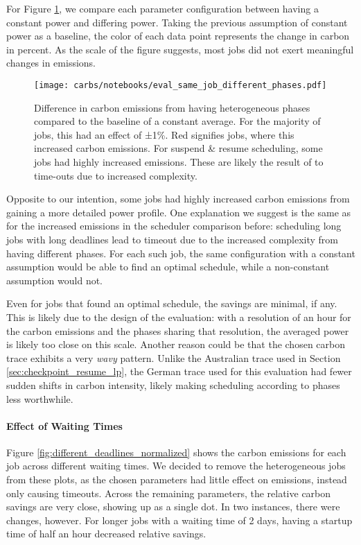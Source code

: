 \newpage
For Figure \ref{fig:different_phases_no_effect_lol}, we compare each parameter configuration between having a constant power and differing power. Taking the previous assumption of constant power as a baseline, the color of each data point represents the change in carbon in percent. As the scale of the figure suggests, most jobs did not exert meaningful changes in emissions. 

\begin{figure}[H]
    \texttt{[image: carbs/notebooks/eval\_same\_job\_different\_phases.pdf]}
    \caption[short]{Difference in carbon emissions from having heterogeneous phases compared to the baseline of a constant average. For the majority of jobs, this had an effect of ±1\%. Red signifies jobs, where this increased carbon emissions. For suspend \& resume scheduling, some jobs had highly increased emissions. These are likely the result of to time-outs due to increased complexity.}

    \label{fig:different_phases_no_effect_lol}
\end{figure}

Opposite to our intention, some jobs had highly increased carbon emissions from gaining a more detailed power profile.
One explanation we suggest is the same as for the increased emissions in the scheduler comparison before: scheduling long jobs with long deadlines lead to timeout due to the increased complexity from having different phases. 
For each such job, the same configuration with a constant assumption would be able to find an optimal schedule, while a non-constant assumption would not.

Even for jobs that found an optimal schedule, the savings are minimal, if any. 
This is likely due to the design of the evaluation: with a resolution of an hour for the carbon emissions and the phases sharing that resolution, the averaged power is likely too close on this scale. Another reason could be that the chosen carbon trace exhibits a very \emph{wavy} pattern. Unlike the Australian trace used in Section \ref{sec:checkpoint_resume_lp}, the German trace used for this evaluation had fewer sudden shifts in carbon intensity, likely making scheduling according to phases less worthwhile.

\paragraph{Effect of Waiting Times}

Figure \ref{fig:different_deadlines_normalized} shows the carbon emissions for each job across different waiting times.
We decided to remove the heterogeneous jobs from these plots, as the chosen parameters had little effect on emissions, instead only causing timeouts. 
Across the remaining parameters, the relative carbon savings are very close, showing up as a single dot.
In two instances, there were changes, however.
For longer jobs with a waiting time of 2 days, having a startup time of half an hour decreased relative savings. 


